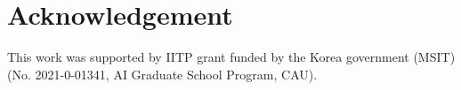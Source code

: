 \documentclass[runningheads]{llncs}
\begin{document}










\section*{Acknowledgement}
This work was supported by IITP grant funded by the Korea government (MSIT) (No. 2021-0-01341, AI Graduate School Program, CAU).

\clearpage


%
%




\clearpage

\end{document}

